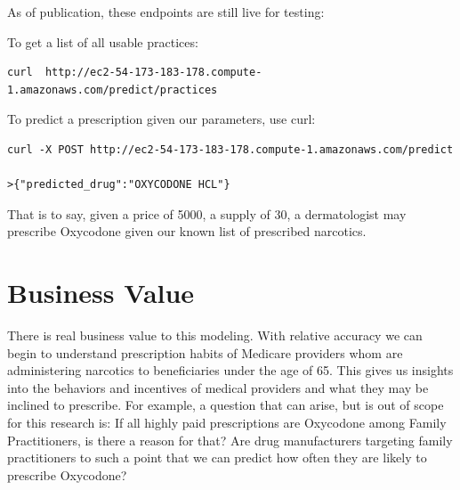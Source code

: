 \documentclass{article}
\begin{document}
As of publication, these endpoints are still live for testing:
\newline
\newline

\newline
\newline

\newline
\newline

To get a list of all usable practices:

\noindent\begin{minipage}{\linewidth}
\begin{verbatim}
curl  http://ec2-54-173-183-178.compute-1.amazonaws.com/predict/practices

\end{verbatim}
\end{minipage}
\newline
\newline
To predict a prescription given our parameters, use curl:

\noindent\begin{minipage}{\linewidth}
\begin{verbatim}
curl -X POST http://ec2-54-173-183-178.compute-1.amazonaws.com/predict

>{"predicted_drug":"OXYCODONE HCL"}
\end{verbatim}
\end{minipage}

That is to say, given a price of 5000, a supply of 30, a dermatologist may prescribe Oxycodone given our known list of prescribed narcotics.

\section{Business Value}

There is real business value to this modeling. With relative accuracy we can begin to understand prescription habits of Medicare providers whom are administering narcotics to beneficiaries under the age of 65. This gives us insights into the behaviors and incentives of medical providers and what they may be inclined to prescribe. For example, a question that can arise, but is out of scope for this research is: If all highly paid prescriptions are Oxycodone among Family Practitioners, is there a reason for that? Are drug manufacturers targeting family practitioners to such a point that we can predict how often they are likely to prescribe Oxycodone?
\end{document}
